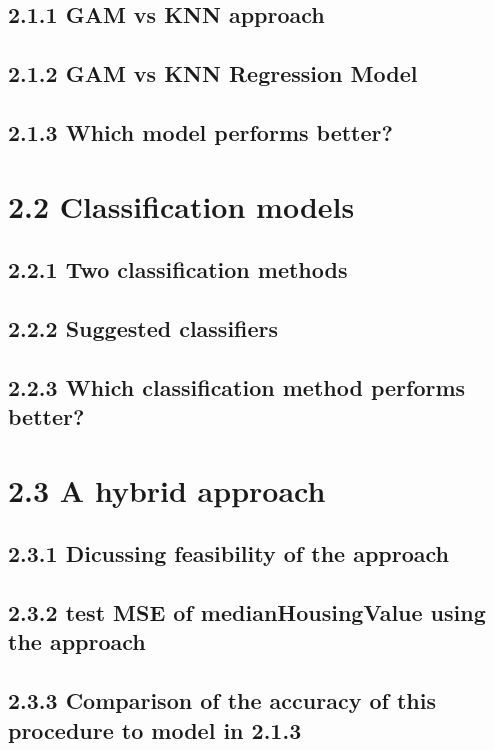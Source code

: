 \documentclass[
]{article}
\begin{document}
\subsection{2.1.1 GAM vs KNN approach}\label{gam-vs-knn-approach}

\subsection{2.1.2 GAM vs KNN Regression
Model}\label{gam-vs-knn-regression-model}

\subsection{2.1.3 Which model performs
better?}\label{which-model-performs-better}

\section{2.2 Classification models}\label{classification-models}

\subsection{2.2.1 Two classification
methods}\label{two-classification-methods}

\subsection{2.2.2 Suggested classifiers}\label{suggested-classifiers}

\subsection{2.2.3 Which classification method performs
better?}\label{which-classification-method-performs-better}

\section{2.3 A hybrid approach}\label{a-hybrid-approach}

\subsection{2.3.1 Dicussing feasibility of the
approach}\label{dicussing-feasibility-of-the-approach}

\subsection{2.3.2 test MSE of medianHousingValue using the
approach}\label{test-mse-of-medianhousingvalue-using-the-approach}

\subsection{2.3.3 Comparison of the accuracy of this procedure to model
in
2.1.3}\label{comparison-of-the-accuracy-of-this-procedure-to-model-in-2.1.3}
\end{document}
